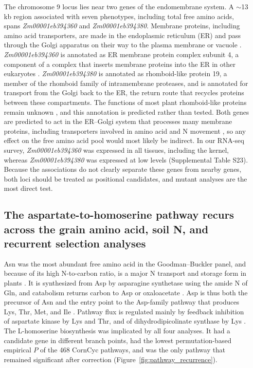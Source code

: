 \documentclass[namedate,unnumsec,webpdf,contemporary,large]{oup-authoring-template}
\begin{document}
The chromosome 9 locus lies near two genes of the endomembrane system. A $\sim$13 kb region associated with seven phenotypes, including total free amino acids, spans \textit{Zm00001eb394360} and \textit{Zm00001eb394380}. Membrane proteins, including amino acid transporters, are made in the endoplasmic reticulum (ER) and pass through the Golgi apparatus on their way to the plasma membrane or vacuole \citep{Brandizzi2018ERGolgi}. \textit{Zm00001eb394360} is annotated as ER membrane protein complex subunit 4, a component of a complex that inserts membrane proteins into the ER in other eukaryotes \citep{Guna2018EMC}. \textit{Zm00001eb394380} is annotated as rhomboid-like protein 19, a member of the rhomboid family of intramembrane proteases, and is annotated for transport from the Golgi back to the ER, the return route that recycles proteins between these compartments. The functions of most plant rhomboid-like proteins remain unknown \citep{Lavell2021RBL10}, and this annotation is predicted rather than tested. Both genes are predicted to act in the ER--Golgi system that processes many membrane proteins, including transporters involved in amino acid and N movement \citep{Brandizzi2018ERGolgi}, so any effect on the free amino acid pool would most likely be indirect. In our RNA-seq survey, \textit{Zm00001eb394360} was expressed in all tissues, including the kernel, whereas \textit{Zm00001eb394380} was expressed at low levels (Supplemental Table S23). Because the associations do not clearly separate these genes from nearby genes, both loci should be treated as positional candidates, and mutant analyses are the most direct test.

\subsection{The aspartate-to-homoserine pathway recurs across the grain amino acid, soil N, and recurrent selection analyses}

Asn was the most abundant free amino acid in the Goodman--Buckler panel, and because of its high N-to-carbon ratio, is a major N transport and storage form in plants \citep{Lea2007Asparagine}. It is synthesized from Asp by asparagine synthetase using the amide N of Gln, and catabolism returns carbon to Asp or oxaloacetate \citep{Lea2007Asparagine}. Asp is thus both the precursor of Asn and the entry point to the Asp-family pathway that produces Lys, Thr, Met, and Ile \citep{Han2021Aspartate, Wang2018AspSeeds, Viola2001AspartatePathway}. Pathway flux is regulated mainly by feedback inhibition of aspartate kinase by Lys and Thr, and of dihydrodipicolinate synthase by Lys \citep{Azevedo2006AspPathway, Jander2009AspArabidopsis}. The L-homoserine biosynthesis was implicated by all four analyses. It had a candidate gene in different branch points, had the lowest permutation-based empirical $P$ of the 468 CornCyc pathways, and was the only pathway that remained significant after correction (Figure~\ref{fig:pathway_recurrence}).
\end{document}
